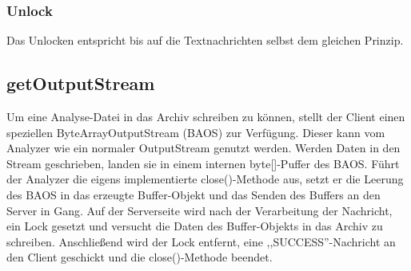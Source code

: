 
\subsubsection{Unlock}

Das Unlocken entspricht bis auf die Textnachrichten selbst dem gleichen Prinzip.


\subsection {getOutputStream}

Um eine Analyse-Datei in das Archiv schreiben zu können, stellt der Client einen speziellen ByteArrayOutputStream (BAOS) zur Verfügung.
Dieser kann vom Analyzer wie ein normaler OutputStream genutzt werden.
Werden Daten in den Stream geschrieben, landen sie in einem internen byte[]-Puffer des BAOS.
Führt der Analyzer die eigens implementierte close()-Methode aus, setzt er die Leerung des BAOS in das erzeugte Buffer-Objekt und das Senden des Buffers an den Server in Gang.
Auf der Serverseite wird nach der Verarbeitung der Nachricht, ein Lock gesetzt und versucht die Daten des Buffer-Objekts in das Archiv zu schreiben.
Anschließend wird der Lock entfernt, eine ,,SUCCESS''-Nachricht an den Client geschickt und die close()-Methode beendet.

